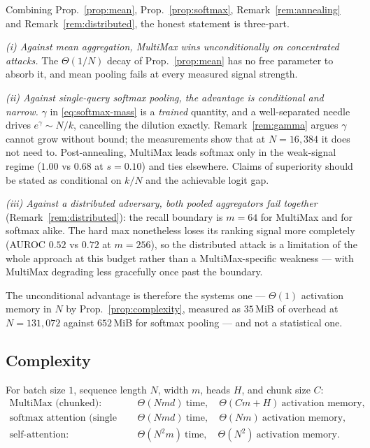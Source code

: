 \begin{remark}
\label{rem:scope}
Combining Prop.~\ref{prop:mean}, Prop.~\ref{prop:softmax},
Remark~\ref{rem:annealing} and Remark~\ref{rem:distributed}, the honest statement is
three-part.

\emph{(i) Against mean aggregation, MultiMax wins unconditionally on concentrated
attacks.} The $\Theta(1/N)$ decay of Prop.~\ref{prop:mean} has no free parameter to
absorb it, and mean pooling fails at every measured signal strength.

\emph{(ii) Against single-query softmax pooling, the advantage is conditional and
narrow.} $\gamma$ in \eqref{eq:softmax-mass} is a \emph{trained} quantity, and a
well-separated needle drives $e^{\gamma}\!\sim\!N/k$, cancelling the dilution exactly.
Remark~\ref{rem:gamma} argues $\gamma$ cannot grow without bound; the measurements show
that at $N=16{,}384$ it does not need to. Post-annealing, MultiMax leads softmax only in
the weak-signal regime ($1.00$ vs $0.68$ at $s=0.10$) and ties elsewhere. Claims of
superiority should be stated as conditional on $k/N$ and the achievable logit gap.

\emph{(iii) Against a distributed adversary, both pooled aggregators fail together}
(Remark~\ref{rem:distributed}): the recall boundary is $m=64$ for MultiMax and for
softmax alike. The hard max nonetheless loses its ranking signal more completely
(AUROC $0.52$ vs $0.72$ at $m=256$), so the distributed attack is a limitation of the
whole approach at this budget rather than a MultiMax-specific weakness --- with MultiMax
degrading less gracefully once past the boundary.

The unconditional advantage is therefore the systems one --- $\Theta(1)$ activation
memory in $N$ by Prop.~\ref{prop:complexity}, measured as $35$\,MiB of overhead at
$N=131{,}072$ against $652$\,MiB for softmax pooling --- and not a statistical one.
\end{remark}

\subsection{Complexity}

\begin{proposition}
\label{prop:complexity}
For batch size $1$, sequence length $N$, width $m$, heads $H$, and chunk size $C$:
\begin{equation}
  \begin{aligned}
    \text{MultiMax (chunked):}\quad &\Theta(Nmd)\ \text{time},\quad
      \Theta(Cm+H)\ \text{activation memory},\\
    \text{softmax attention (single query):}\quad &\Theta(Nmd)\ \text{time},\quad
      \Theta(Nm)\ \text{activation memory},\\
    \text{self-attention:}\quad &\Theta(N^2m)\ \text{time},\quad
      \Theta(N^2)\ \text{activation memory}.
  \end{aligned}
  \label{eq:complexity}
\end{equation}
\end{proposition}

